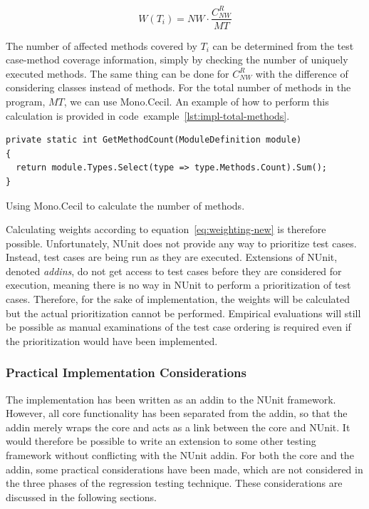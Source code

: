 \documentclass[a4paper,english,12pt]{report}
\begin{document}
\begin{equation}\label{eq:weighting-new}
  W(T_i)= NW \cdot \frac{C_{NW}^{R}}{MT}
\end{equation}

The number of affected methods covered by $T_i$ can be determined from the test case-method coverage information, simply by checking the number of uniquely executed methods. The same thing can be done for $C_{\mathit{NW}}^{R}$ with the difference of considering classes instead of methods. For the total number of methods in the program, $\mathit{MT}$, we can use Mono.Cecil. An example of how to perform this calculation is provided in code~example~\vref{lst:impl-total-methods}.

\begin{listing}[htbp]
{\footnotesize
\begin{verbatim}
private static int GetMethodCount(ModuleDefinition module)
{
  return module.Types.Select(type => type.Methods.Count).Sum();
}
\end{verbatim}
}
\caption{Using Mono.Cecil to calculate the number of methods.}
\label{lst:impl-total-methods}
\end{listing}

Calculating weights according to equation~\vref{eq:weighting-new} is therefore possible. Unfortunately, NUnit does not provide any way to prioritize test cases. Instead, test cases are being run as they are executed. \citep{poole2012test} Extensions of NUnit, denoted \textit{addins}, do not get access to test cases before they are considered for execution, meaning there is no way in NUnit to perform a prioritization of test cases. Therefore, for the sake of implementation, the weights will be calculated but the actual prioritization cannot be performed. Empirical evaluations will still be possible as manual examinations of the test case ordering is required even if the prioritization would have been implemented.

\subsubsection{Practical Implementation Considerations}
The implementation has been written as an addin to the NUnit framework. However, all core functionality has been separated from the addin, so that the addin merely wraps the core and acts as a link between the core and NUnit. It would therefore be possible to write an extension to some other testing framework without conflicting with the NUnit addin. For both the core and the addin, some practical considerations have been made, which are not considered in the three phases of the regression testing technique. These considerations are discussed in the following sections.
\end{document}
